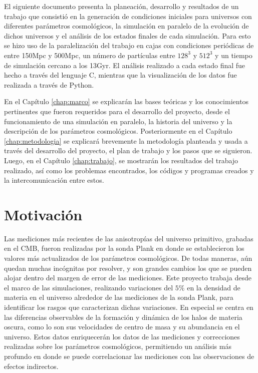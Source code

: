 El siguiente documento presenta la planeación, desarrollo y resultados de un trabajo que consistió en la generación de condiciones iniciales para universos con diferentes parámetros cosmológicos, la simulación en paralelo de la evolución de dichos universos y el análisis de los estados finales de cada simulación. Para esto se hizo uso de la paralelización del trabajo en cajas con condiciones periódicas de entre 150Mpc y 500Mpc, un número de partículas entre $128^3$ y $512^3$ y un tiempo de simulación cercano a los 13Gyr. El análisis realizado a cada estado final fue hecho a través del lenguaje C, mientras que la visualización de los datos fue realizada a través de Python. 

En el Capítulo \ref{chap:marco} se explicarán las bases teóricas y los conocimientos pertinentes que fueron requeridos para el desarrollo del proyecto, desde el funcionamiento de una simulación en paralelo, la historia del universo y la descripción de los parámetros cosmológicos. Posteriormente en el Capítulo \ref{chap:metodologia} se explicará brevemente la metodología planteada y usada a través del desarrollo del proyecto, el plan de trabajo y los pasos que se siguieron. Luego, en el Capítulo \ref{chap:trabajo}, se mostrarán los resultados del trabajo realizado, así como los problemas encontrados, los códigos y programas creados y la intercomunicación entre estos.

\section{Motivación}
Las mediciones más recientes de las anisotropías del universo primitivo, grabadas en el CMB, fueron realizadas por la sonda Plank en donde se establecieron los valores más actualizados de los parámetros cosmológicos. De todas maneras, aún quedan muchas incógnitas por resolver, y son grandes cambios los que se pueden alojar dentro del margen de error de las mediciones. Este proyecto trabaja desde el marco de las simulaciones, realizando variaciones del $5\%$ en la densidad de materia en el universo alrededor de las mediciones de la sonda Plank, para identificar los rasgos que caracterizan dichas variaciones. En especial se centra en las diferencias observables de la formación y dinámica de los halos de materia oscura, como lo son sus velocidades de centro de masa y su abundancia en el universo. Estos datos enriquecerán los datos de las mediciones y correcciones realizadas sobre los parámetros cosmológicos, permitiendo un análisis más profundo en donde se puede correlacionar las mediciones con las observaciones de efectos indirectos.


